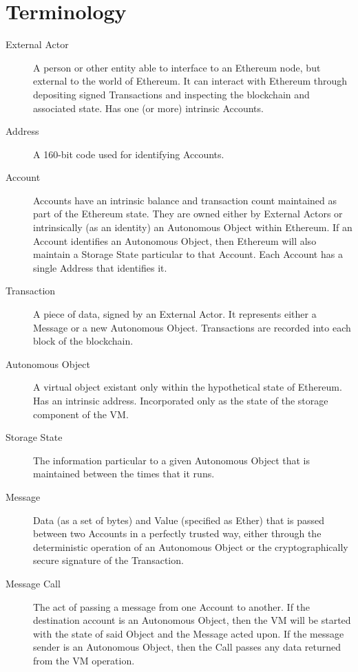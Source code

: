 \documentclass[9pt,oneside]{amsart}
\begin{document}
\appendix

\section{Terminology}

\begin{description}
\item[External Actor] A person or other entity able to interface to an Ethereum node, but external to the world of Ethereum. It can interact with Ethereum through depositing signed Transactions and inspecting the blockchain and associated state. Has one (or more) intrinsic Accounts.

\item[Address] A 160-bit code used for identifying Accounts.

\item[Account] Accounts have an intrinsic balance and transaction count maintained as part of the Ethereum state. They are owned either by External Actors or intrinsically (as an identity) an Autonomous Object within Ethereum. If an Account identifies an Autonomous Object, then Ethereum will also maintain a Storage State particular to that Account. Each Account has a single Address that identifies it.

\item[Transaction] A piece of data, signed by an External Actor. It represents either a Message or a new Autonomous Object. Transactions are recorded into each block of the blockchain.

\item[Autonomous Object] A virtual object existant only within the hypothetical state of Ethereum.  Has an intrinsic address. Incorporated only as the state of the storage component of the VM.

\item[Storage State] The information particular to a given Autonomous Object that is maintained between the times that it runs.

\item[Message] Data (as a set of bytes) and Value (specified as Ether) that is passed between two Accounts in a perfectly trusted way, either through the deterministic operation of an Autonomous Object or the cryptographically secure signature of the Transaction.

\item[Message Call] The act of passing a message from one Account to another. If the destination account is an Autonomous Object, then the VM will be started with the state of said Object and the Message acted upon. If the message sender is an Autonomous Object, then the Call passes any data returned from the VM operation.


\end{description}
\end{document}
